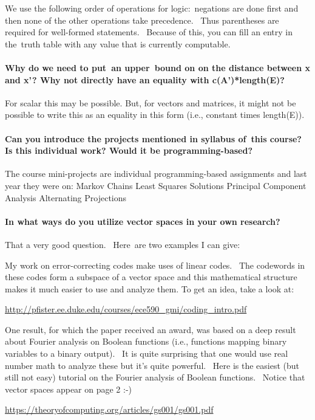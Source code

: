 \documentclass[10pt,english]{article}
\begin{document}
We use the following order of operations for logic: negations are done first and then none of the other operations take precedence.  Thus parentheses are required for well-formed statements.  Because of this, you can fill an entry in the truth table with any value that is currently computable.

\paragraph{Why do we need to put an upper bound on on the distance between x and x'? Why not directly have an equality with c(A')*length(E)?}

For scalar this may be possible.  But, for vectors and matrices, it might not be possible to write this as an equality in this form (i.e., constant times length(E)).

\paragraph{Can you introduce the projects mentioned in syllabus of this course? Is this individual work? Would it be programming-based?}

The course mini-projects are individual programming-based assignments and last year they were on:
Markov Chains
Least Squares Solutions
Principal Component Analysis
Alternating Projections


\paragraph{In what ways do you utilize vector spaces in your own research?}

That a very good question.  Here are two examples I can give:

My work on error-correcting codes make uses of linear codes.  The codewords in these codes form a subspace of a vector space and this mathematical structure makes it much easier to use and analyze them. To get an idea, take a look at:
\begin{center}
\url{http://pfister.ee.duke.edu/courses/ece590_gmi/coding_intro.pdf}
\end{center}

One result, for which the paper received an award, was based on a deep result about Fourier analysis on Boolean functions (i.e., functions mapping binary variables to a binary output).  It is quite surprising that one would use real number math to analyze these but it's quite powerful.  Here is the easiest (but still not easy) tutorial on the Fourier analysis of Boolean functions.  Notice that vector spaces appear on page 2 :-)
\begin{center}
\url{https://theoryofcomputing.org/articles/gs001/gs001.pdf}
\end{center}
\end{document}
